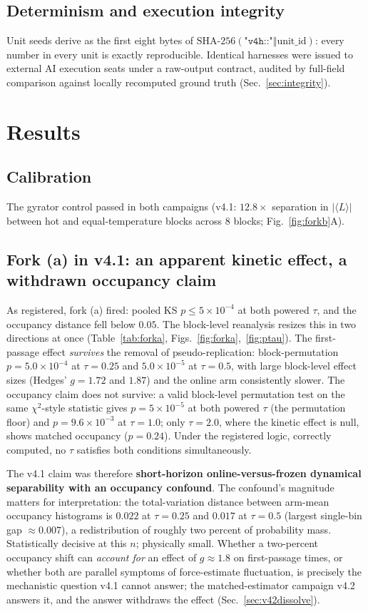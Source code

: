 \documentclass[11pt]{article}
\begin{document}
\subsection{Determinism and execution integrity}
Unit seeds derive as the first eight bytes of $\mathrm{SHA\text{-}256}(\texttt{"v4h::"} \Vert \text{unit\_id})$: every number in every unit is exactly reproducible. Identical harnesses were issued to external AI execution seats under a raw-output contract, audited by full-field comparison against locally recomputed ground truth (Sec.~\ref{sec:integrity}).

\section{Results}

\subsection{Calibration}
The gyrator control passed in both campaigns (v4.1: $12.8\times$ separation in $|\langle L\rangle|$ between hot and equal-temperature blocks across 8 blocks; Fig.~\ref{fig:forkb}A).

\subsection{Fork (a) in v4.1: an apparent kinetic effect, a withdrawn occupancy claim}\label{sec:forka}
As registered, fork (a) fired: pooled KS $p \le 5\times10^{-4}$ at both powered $\tau$, and the occupancy distance fell below $0.05$. The block-level reanalysis resizes this in two directions at once (Table~\ref{tab:forka}, Figs.~\ref{fig:forka},~\ref{fig:ptau}). The first-passage effect \emph{survives} the removal of pseudo-replication: block-permutation $p = 5.0\times10^{-4}$ at $\tau{=}0.25$ and $5.0\times10^{-5}$ at $\tau{=}0.5$, with large block-level effect sizes (Hedges' $g = 1.72$ and $1.87$) and the online arm consistently slower. The occupancy claim does not survive: a valid block-level permutation test on the same $\chi^2$-style statistic gives $p = 5\times10^{-5}$ at both powered $\tau$ (the permutation floor) and $p = 9.6\times10^{-3}$ at $\tau{=}1.0$; only $\tau{=}2.0$, where the kinetic effect is null, shows matched occupancy ($p = 0.24$). Under the registered logic, correctly computed, no $\tau$ satisfies both conditions simultaneously.

The v4.1 claim was therefore \textbf{short-horizon online-versus-frozen dynamical separability with an occupancy confound}. The confound's magnitude matters for interpretation: the total-variation distance between arm-mean occupancy histograms is $0.022$ at $\tau{=}0.25$ and $0.017$ at $\tau{=}0.5$ (largest single-bin gap $\approx 0.007$), a redistribution of roughly two percent of probability mass. Statistically decisive at this $n$; physically small. Whether a two-percent occupancy shift can \emph{account for} an effect of $g \approx 1.8$ on first-passage times, or whether both are parallel symptoms of force-estimate fluctuation, is precisely the mechanistic question v4.1 cannot answer; the matched-estimator campaign v4.2 answers it, and the answer withdraws the effect (Sec.~\ref{sec:v42dissolve}).
\end{document}

